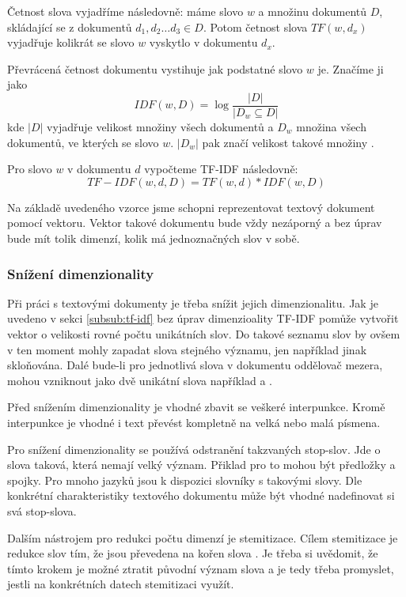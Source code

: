 \documentclass[thesis=M,czech]{FITthesis}[2012/10/20]
\begin{document}
			Četnost slova vyjadříme následovně: máme slovo $w$ a množinu dokumentů $D$, skládající se z dokumentů $d_1, d_2 \ldots d_3 \in D$. Potom četnost slova $TF(w, d_x)$ vyjadřuje kolikrát se slovo $w$ vyskytlo v dokumentu $d_x$.
			
			Převrácená četnost dokumentu vystihuje jak podstatné slovo $w$ je. Značíme ji jako $$IDF(w,D) = \log{\frac{|D|}{|D_w \subseteq D|}}$$ kde $|D|$ vyjadřuje velikost množiny všech dokumentů a $D_w$ množina všech dokumentů, ve kterých se slovo $w$. $|D_w|$ pak značí velikost takové množiny \cite{RamosTF-IDF}.
			
			Pro slovo $w$ v dokumentu $d$ vypočteme TF-IDF následovně:
			$$TF-IDF(w,d,D) = TF(w,d) * IDF(w,D)$$
			
			Na základě uvedeného vzorce jsme schopni reprezentovat textový dokument pomocí vektoru. Vektor takové dokumentu bude vždy nezáporný a bez úprav bude mít tolik dimenzí, kolik má jednoznačných slov v sobě.
			
		\subsubsection{Snížení dimenzionality}
			Při práci s textovými dokumenty je třeba snížit jejich dimenzionalitu. Jak je uvedeno v sekci \ref{subsub:tf-idf} bez úprav dimenzioality TF-IDF pomůže vytvořit vektor o velikosti rovné počtu unikátních slov. Do takové seznamu slov by ovšem v ten moment mohly zapadat slova stejného významu, jen například jinak skloňována. Dalé bude-li pro jednotlivá slova v dokumentu oddělovač mezera, mohou vzniknout jako dvě unikátní slova například  a .
			
			Před snížením dimenzionality je vhodné zbavit se veškeré interpunkce. Kromě interpunkce je vhodné i text převést kompletně na velká nebo malá písmena.
						
			Pro snížení dimenzionality se používá odstranění takzvaných stop-slov. Jde o slova taková, která nemají velký význam. Přiklad pro to mohou být předložky a spojky. Pro mnoho jazyků jsou k dispozici slovníky s takovými slovy. Dle konkrétní charakteristiky textového dokumentu může být vhodné nadefinovat si svá stop-slova.
			
			Dalším nástrojem pro redukci počtu dimenzí je stemitizace. Cílem stemitizace je redukce slov tím, že jsou převedena na kořen slova \cite{textPreprop}. Je třeba si uvědomit, že tímto krokem je možné ztratit původní význam slova a je tedy třeba promyslet,  jestli na konkrétních datech stemitizaci využít.
		
\end{document}

